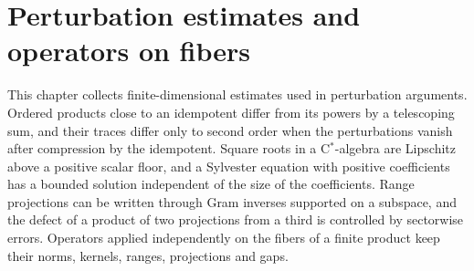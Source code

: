 \chapter{Perturbation estimates and operators on fibers}
\label{ch:perturbation_estimates}

This chapter collects finite-dimensional estimates used in perturbation
arguments. Ordered products close to an idempotent differ from its powers by
a telescoping sum, and their traces differ only to second order when the
perturbations vanish after compression by the idempotent. Square roots in a
C$^*$-algebra are Lipschitz above a positive scalar floor, and a Sylvester
equation with positive coefficients has a bounded solution independent of the
size of the coefficients. Range projections can be written through Gram
inverses supported on a subspace, and the defect of a product of two
projections from a third is controlled by sectorwise errors. Operators applied
independently on the fibers of a finite product keep their norms, kernels,
ranges, projections and gaps.







